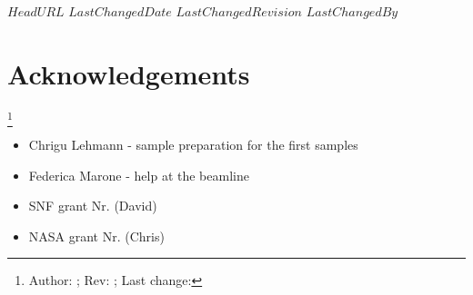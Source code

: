 \svnidlong
{$HeadURL$}
{$LastChangedDate$}
{$LastChangedRevision$}
{$LastChangedBy$}

\section{Acknowledgements}
\footnote{Author: \svnauthor; Rev: \svnrev; Last change: \svndate}%
\begin{itemize}
	\item Chrigu Lehmann - sample preparation for the first samples
	\item Federica Marone - help at the beamline
	\item SNF grant Nr. (David)
	\item NASA grant Nr. (Chris)
\end{itemize}